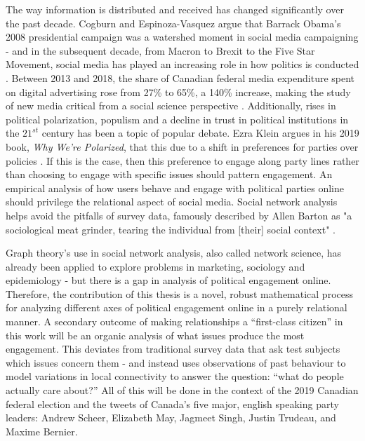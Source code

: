 The way information is distributed and received has changed significantly over the past decade. Cogburn and Espinoza-Vasquez argue that Barrack Obama’s 2008 presidential campaign was a watershed moment in social media campaigning - and in the subsequent decade, from Macron to Brexit to the Five Star Movement, social media has played an increasing role in how politics is conducted \cite{cogburn2011networked}. Between 2013 and 2018, the share of Canadian federal media expenditure spent on digital advertising rose from 27\% to 65\%, a 140\% increase, making the study of new media critical from a social science perspective \cite{annualReportCanadaAdvertisingActivities_2018}. Additionally, rises in political polarization, populism and a decline in trust in political institutions in the $21^{st}$ century has been a topic of popular debate. Ezra Klein argues in his 2019 book, \emph{Why We're Polarized}, that this due to a shift in preferences for parties over policies \cite{levitsky2018democracies}. If this is the case, then this preference to engage along party lines rather than choosing to engage with specific issues should pattern engagement. An empirical analysis of how users behave and engage with political parties online should privilege the relational aspect of social media. Social network analysis helps avoid the pitfalls of survey data, famously described by Allen Barton as "a sociological meat grinder, tearing the individual from [their] social context" \cite{freeman2004development}.

Graph theory’s use in social network analysis, also called network science, has already been applied to explore problems in marketing, sociology and epidemiology - but there is a gap in analysis of political engagement online. Therefore, the contribution of this thesis is a novel, robust mathematical process for analyzing different axes of political engagement online in a purely relational manner. A secondary outcome of making relationships a “first-class citizen” in this work will be an organic analysis of what issues produce the most engagement. This deviates from traditional survey data that ask test subjects which issues concern them - and instead uses observations of past behaviour to model variations in local connectivity to answer the question: “what do people actually care about?” All of this will be done in the context of the 2019 Canadian federal election and the tweets of Canada's five major, english speaking party leaders: Andrew Scheer, Elizabeth May, Jagmeet Singh, Justin Trudeau, and Maxime Bernier. 

